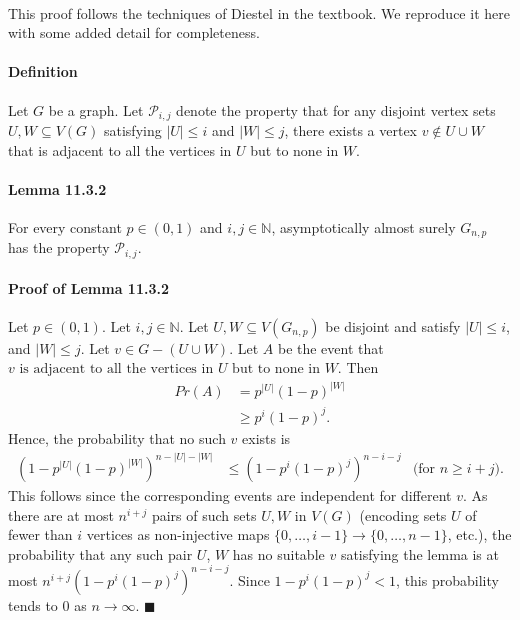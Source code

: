 \documentclass[letterpaper,12pt,oneside,onecolumn]{report}
\begin{document}
\paragraph{}
This proof follows the techniques of Diestel in the textbook. We reproduce it here with some added detail for completeness.
\paragraph{Definition}
Let $G$ be a graph. Let $\mathcal{P}_{i,j}$ denote the property that for any disjoint vertex sets $U, W \subseteq V(G)$ satisfying $|U| \leq i$ and $|W| \leq j$, there exists a vertex $v \not\in U \cup W$ that is adjacent to all the vertices in $U$ but to none in $W$.
\paragraph{Lemma 11.3.2} For every constant $p \in (0,1)$ and $i,j \in \mathbb{N}$, asymptotically almost surely $G_{n,p}$ has the property $\mathcal{P}_{i,j}$.
\paragraph{Proof of Lemma 11.3.2}
Let $p \in (0,1)$. Let $i,j \in \mathbb{N}$. Let $U, W \subseteq V(G_{n,p})$ be disjoint and satisfy $|U| \leq i$, and $|W| \leq j$. Let $v \in G - (U \cup W)$. Let $A$ be the event that $v \text{ is adjacent to all the vertices in $U$ but to none in $W$}$. Then 
\begin{align*}
Pr(A) &= p^{|U|}(1-p)^{|W|} \\
&\geq p^i(1-p)^j.
\end{align*}
Hence, the probability that no such $v$ exists is 
\begin{align*}
(1 - p^{|U|}(1-p)^{|W|})^{n-|U|-|W|} &\leq (1-p^i(1-p)^j)^{n-i-j} &\text{(for $n \geq i + j$)}.
\end{align*}
This follows since the corresponding events are independent for different $v$. As there are at most $n^{i+j}$ pairs of such sets $U,W$ in $V(G)$ (encoding sets $U$ of fewer than $i$ vertices as non-injective maps $\{0,\dots,i-1\} \rightarrow \{0, \dots, n-1\}$, etc.), the probability that any such pair $U$, $W$ has no suitable $v$ satisfying the lemma is at most $n^{i+j}(1-p^i(1-p)^j)^{n-i-j}$. Since $1-p^i(1-p)^j < 1$, this probability tends to $0$ as $n \rightarrow \infty$. $\blacksquare$
\end{document}
